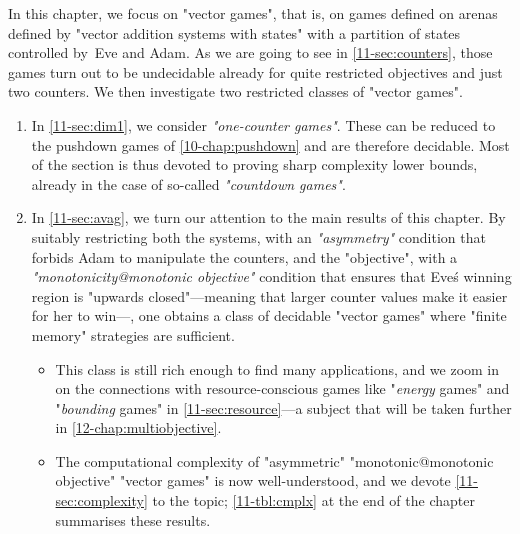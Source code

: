 In this chapter, we focus on "vector games", that is, on games defined
on arenas defined by "vector addition systems with states" with a
partition of states controlled by~Eve and Adam.  As we are going to
see in \cref{11-sec:counters}, those games turn out to be undecidable
already for quite restricted objectives and just two counters.  We
then investigate two restricted classes of "vector games".
\begin{enumerate}
\item In \cref{11-sec:dim1}, we consider \emph{"one-counter games"}.  These can
  be reduced to the pushdown games of \cref{10-chap:pushdown} and are
  therefore decidable.  Most of the section is thus devoted to proving
  sharp complexity lower bounds, already in the case of so-called
  \emph{"countdown games"}.
\item In \cref{11-sec:avag}, we turn our attention to the main results of
  this chapter.  By suitably restricting both
  the systems, with an
  \emph{"asymmetry"} condition that forbids Adam to manipulate the
  counters, and
  the "objective", with a \emph{"monotonicity@monotonic objective"}
    condition that ensures that Eve\'s winning region is "upwards
    closed"---meaning that larger counter values make it easier for
    her to win---,
  one obtains a class of decidable "vector games" where "finite
  memory" strategies are sufficient.
  \begin{itemize}
  \item   This class is still rich enough to find many applications, and we
  zoom in on the connections with resource-conscious games like
  "\emph{energy} games" and "\emph{bounding} games" in
  \cref{11-sec:resource}---a subject that will be taken further in
  \cref{12-chap:multiobjective}.
  
  \item The computational complexity of "asymmetric" "monotonic@monotonic
  objective" "vector games" is now well-understood, and we devote
  \cref{11-sec:complexity} to the topic; \cref{11-tbl:cmplx} at the end of
  the chapter summarises these results.
  \end{itemize}
\end{enumerate}


\ifstandalone
{}
\tableofcontents
\fi

